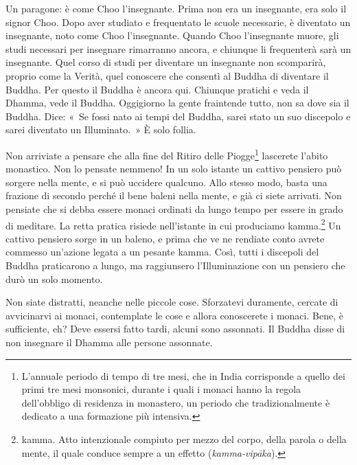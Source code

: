 Un paragone: è come Choo l'insegnante. Prima non era un insegnante, era
solo il signor Choo. Dopo aver studiato e frequentato le scuole
necessarie, è diventato un insegnante, noto come Choo l'insegnante.
Quando Choo l'insegnante muore, gli studi necessari per insegnare
rimarranno ancora, e chiunque li frequenterà sarà un insegnante. Quel
corso di studi per diventare un insegnante non scomparirà, proprio come
la Verità, quel conoscere che consentì al Buddha di diventare il Buddha.
Per questo il Buddha è ancora qui. Chiunque pratichi e veda il Dhamma,
vede il Buddha. Oggigiorno la gente fraintende tutto, non sa dove sia il
Buddha. Dice: «~Se fossi nato ai tempi del Buddha, sarei stato un suo
discepolo e sarei diventato un Illuminato.~» È solo follia.

Non arriviate a pensare che alla fine del Ritiro delle Piogge\footnote{L'annuale
  periodo di tempo di tre mesi, che in India corrisponde a quello dei
  primi tre mesi monsonici, durante i quali i monaci hanno la regola
  dell'obbligo di residenza in monastero, un periodo che
  tradizionalmente è dedicato a una formazione più intensiva.} lascerete
l'abito monastico. Non lo pensate nemmeno! In un solo istante un cattivo
pensiero può sorgere nella mente, e si può uccidere qualcuno. Allo
stesso modo, basta una frazione di secondo perché il bene baleni nella
mente, e già ci siete arrivati. Non pensiate che si debba essere monaci
ordinati da lungo tempo per essere in grado di meditare. La retta
pratica risiede nell'istante in cui produciamo kamma.\footnote{%
  kamma. Atto intenzionale compiuto per mezzo del corpo, della parola o della
  mente, il quale conduce sempre a un effetto (\emph{kamma-vipāka}).}
Un cattivo pensiero sorge in un baleno, e prima che ve ne rendiate conto
avrete commesso un'azione legata a un pesante kamma. Così, tutti
i discepoli del Buddha praticarono a lungo, ma raggiunsero
l'Illuminazione con un pensiero che durò un solo momento.

Non siate distratti, neanche nelle piccole cose. Sforzatevi duramente,
cercate di avvicinarvi ai monaci, contemplate le cose e allora
conoscerete i monaci. Bene, è sufficiente, eh? Deve essersi fatto tardi,
alcuni sono assonnati. Il Buddha disse di non insegnare il Dhamma alle
persone assonnate.

